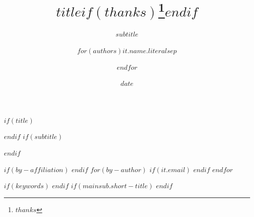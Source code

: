 $if(title)$
\title{$title$$if(thanks)$\thanks{$thanks$}$endif$}
$endif$
$if(subtitle)$
\subtitle{$subtitle$}
$endif$
\author{$for(authors)$$it.name.literal$$sep$ \and $endfor$}
$if(by-affiliation)$
$endif$
$for(by-author)$
$if(it.email)$
$endif$
$endfor$
\date{$date$}
$if(keywords)$
$endif$
$if(mainsub.short-title)$
$endif$
